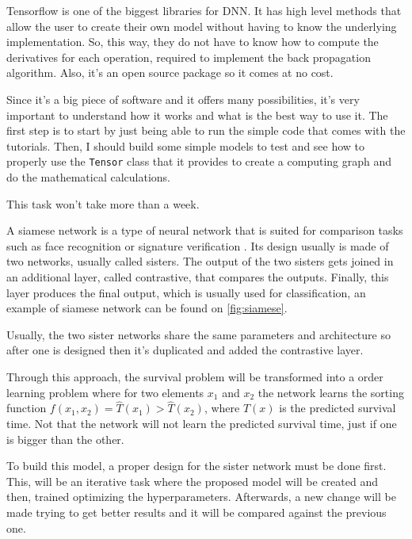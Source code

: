 
Tensorflow\cite{neural:tensorflow} is one of the biggest libraries for \gls{DNN}.
It has high level methods that allow the user to create their own model without having to know
the underlying implementation. So, this way, they do not have to know how to compute the
derivatives for each operation, required to implement the back propagation algorithm. Also,
it's an open source package so it comes at no cost.

Since it's a big piece of software and it offers many possibilities, it's very important to 
understand how it works and what is the best way to use it. The first step is to start by 
just being able to run the simple code that comes with the tutorials. Then, I should build
some simple models to test and see how to properly use the \texttt{Tensor} class that it
provides to create a computing graph and do the mathematical calculations.

This task won't take more than a week.


A siamese network is a type of neural network that is suited for comparison tasks such as 
face recognition or signature verification \cite{neural:siamese:signature}.
Its design usually is made of two networks, usually called sisters. The output of the 
two sisters gets joined in an additional layer, called \gls{contrastive}, that compares
the outputs. Finally, this layer produces the final output, which is usually used for 
classification, an example of siamese network can be found on \autoref{fig:siamese}.

Usually, the two sister networks share the same parameters and architecture so after one 
is designed then it's duplicated and added the \gls{contrastive} layer.

Through this approach, the survival problem will be transformed into a order learning problem
where for two elements \( x_1 \) and \( x_2 \) the network learns the sorting function
\( f(x_1, x_2) = \hat{T}(x_1) > \hat{T}(x_2) \), where \( \hat{T}(x) \) is the predicted 
survival time. Not that the network will not learn the predicted survival time, just if one
is bigger than the other.

To build this model, a proper design for the sister network must be done first. This, will be
an iterative task where the proposed model will be created and then, trained optimizing
the hyperparameters. Afterwards, a new change will be made trying to get better results and
it will be compared against the previous one. 

